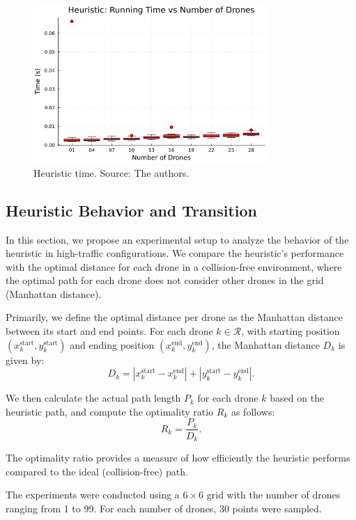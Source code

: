 \begin{figure}[H]
    \centering
    \includegraphics[width=0.8\textwidth]{img/cpp_time_boxplot_vs_drones.png}
    \caption{Heuristic time. Source: The authors.}
    \label{fig:heuristic_time}
\end{figure}

\subsection{Heuristic Behavior and Transition}
\label{sec:transition}

In this section, we propose an experimental setup to analyze the behavior of the heuristic in high-traffic configurations. We compare the heuristic's performance with the optimal distance for each drone in a collision-free environment, where the optimal path for each drone does not consider other drones in the grid (Manhattan distance).

Primarily, we define the optimal distance per drone as the Manhattan distance between its start and end points. For each drone $k \in \mathcal{R}$, with starting position $(x_k^{\text{start}}, y_k^{\text{start}})$ and ending position $(x_k^{\text{end}}, y_k^{\text{end}})$, the Manhattan distance $D_k$ is given by: \[
D_k = |x_k^{\text{start}} - x_k^{\text{end}}| + |y_k^{\text{start}} - y_k^{\text{end}}|\text{.}
\]

We then calculate the actual path length $P_k$ for each drone $k$ based on the heuristic path, and compute the optimality ratio $R_k$ as follows: \[
R_k = \frac{P_k}{D_k}\text{.}
\]

The optimality ratio provides a measure of how efficiently the heuristic performs compared to the ideal (collision-free) path.

The experiments were conducted using a $6 \times 6$ grid with the number of drones ranging from 1 to 99. For each number of drones, 30 points were sampled.

